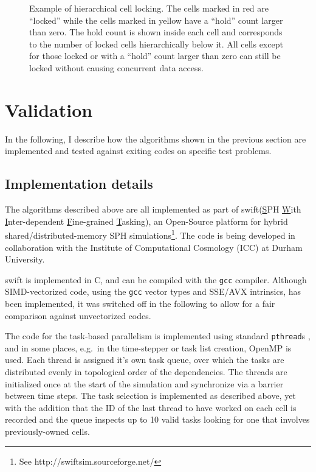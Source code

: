 \documentclass[final]{siamltex}
\newcommand{\swift}
    {{\sc swift}\xspace}
\begin{document}
\begin{figure}
    \centerline{}
    
    \caption{Example of hierarchical cell locking. The cells marked in red
        are ``locked'' while the cells marked in yellow have a ``hold'' count
        larger than zero.
        The hold count is shown inside each cell and corresponds to the number
        of locked cells hierarchically below it.
        All cells except for those locked or with a ``hold'' count larger than
        zero can still be locked without causing concurrent data access.
        }
    \label{fig:CellLocking}
\end{figure}


\section{Validation}

In the following, I describe how the algorithms shown in the previous section
are implemented and tested against exiting codes on specific test problems.

\subsection{Implementation details}

The algorithms described above are all implemented as part
of \swift (\underline{S}PH \underline{W}ith
\underline{I}nter-dependent \underline{F}ine-grained
\underline{T}asking),
an Open-Source platform for hybrid shared/distributed-memory
SPH simulations\footnote{See http://swiftsim.sourceforge.net/}.
The code is being developed in collaboration with the Institute
of Computational Cosmology (ICC) at Durham University.

\swift is implemented in C, and can be compiled with the
{\tt gcc} compiler.
Although SIMD-vectorized code, using the {\tt gcc} vector types
and SSE/AVX intrinsics, has been implemented, it was switched
off in the following to allow for a fair comparison against
unvectorized codes.

The code for the task-based parallelism is implemented using
standard {\tt pthread}s \cite{ref:pthreads}, and in some places,
e.g.~in the time-stepper
or task list creation, OpenMP \cite{ref:Dagum1998} is used.
Each thread is assigned it's own task queue, over which the tasks
are distributed evenly in topological order of the dependencies.
The threads are initialized once at the start of the simulation
and synchronize via a barrier between time steps.
The task selection is implemented as described above, yet with the
addition that the ID of the last thread to have worked on each
cell is recorded and the queue inspects up to 10 valid tasks 
looking for one that involves previously-owned cells.
\end{document}

